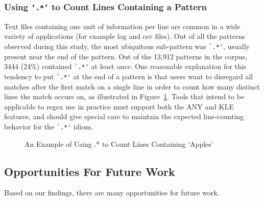 \subsubsection{Using {\tt`.*'} to Count Lines Containing a Pattern}
Text files containing one unit of information per line are common in a wide variety of applications (for example log and csv files).  Out of all the patterns observed during this study, the most ubiquitous sub-pattern was \verb!`.*'!, usually present near the end of the pattern.  Out of the 13,912 patterns in the corpus, 3444 (24\%) contained \verb!`.*'! at least once.
One reasonable explanation for this tendency to put \verb!`.*'! at the end of a pattern is that users want to disregard all matches after the first match on a single line in order to count how many distinct lines the match occurs on, as illustrated in Figure~\ref{fig:lineSearch}.   Tools that intend to be applicable to regex use in practice must support both the ANY and KLE features, and should give special care to maintain the expected line-counting behavior for the \verb!`.*'! idiom.



\begin{figure}[tb]
\centering
{}
\caption{An Example of Using .* to Count Lines Containing `Apples' }
\label{fig:lineSearch}
\end{figure}


\subsection{Opportunities For Future Work}

Based on our findings, there are many opportunities for future work.

